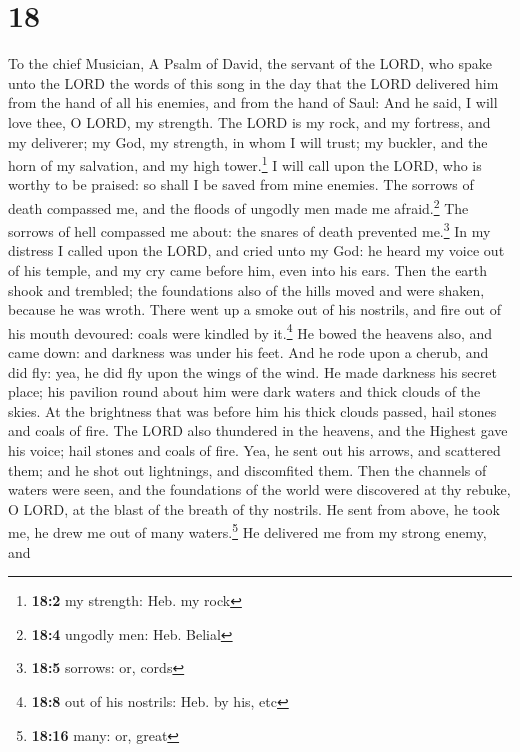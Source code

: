 \hypertarget{section-17}{%
\section{18}\label{section-17}}

To the chief Musician, A Psalm of David, the servant of the LORD, who
spake unto the LORD the words of this song in the day that the LORD
delivered him from the hand of all his enemies, and from the hand of
Saul: And he said,  I will love thee, O LORD, my strength.
 The LORD is my rock, and my fortress, and my deliverer;
my God, my strength, in whom I will trust; my buckler, and the horn of
my salvation, and my high tower.\footnote{\textbf{18:2} my strength:
  Heb. my rock}  I will call upon the LORD, who is worthy
to be praised: so shall I be saved from mine enemies.  The
sorrows of death compassed me, and the floods of ungodly men made me
afraid.\footnote{\textbf{18:4} ungodly men: Heb. Belial} 
The sorrows of hell compassed me about: the snares of death prevented
me.\footnote{\textbf{18:5} sorrows: or, cords}  In my
distress I called upon the LORD, and cried unto my God: he heard my
voice out of his temple, and my cry came before him, even into his ears.
 Then the earth shook and trembled; the foundations also
of the hills moved and were shaken, because he was wroth. 
There went up a smoke out of his nostrils, and fire out of his mouth
devoured: coals were kindled by it.\footnote{\textbf{18:8} out of his
  nostrils: Heb. by his, etc}  He bowed the heavens also,
and came down: and darkness was under his feet.  And he
rode upon a cherub, and did fly: yea, he did fly upon the wings of the
wind.  He made darkness his secret place; his pavilion
round about him were dark waters and thick clouds of the skies.
 At the brightness that was before him his thick clouds
passed, hail stones and coals of fire.  The LORD also
thundered in the heavens, and the Highest gave his voice; hail stones
and coals of fire.  Yea, he sent out his arrows, and
scattered them; and he shot out lightnings, and discomfited them.
 Then the channels of waters were seen, and the
foundations of the world were discovered at thy rebuke, O LORD, at the
blast of the breath of thy nostrils.  He sent from above,
he took me, he drew me out of many waters.\footnote{\textbf{18:16} many:
  or, great}  He delivered me from my strong enemy, and
